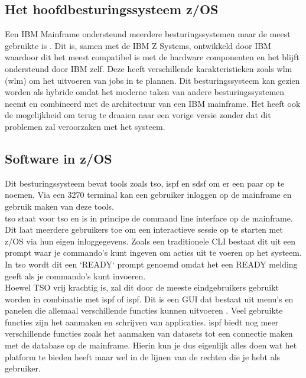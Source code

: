 \subsection{Het hoofdbesturingssysteem z/OS}
Een IBM Mainframe ondersteund meerdere besturingssystemen maar de meest gebruikte is . Dit is, samen met de IBM Z Systems, ontwikkeld door IBM waardoor dit het meest compatibel is met de hardware componenten en het blijft ondersteund door IBM zelf. Deze heeft verschillende karakteristieken zoals \acrlong{wlm} (\acrshort{wlm}) om het uitvoeren van jobs in te plannen. Dit besturingssysteem kan gezien worden als hybride omdat het moderne taken van andere besturingssystemen neemt en combineerd met de architectuur van een IBM mainframe. Het heeft ook de mogelijkheid om terug te draaien naar een vorige versie zonder dat dit problemen zal veroorzaken met het systeem. \autocite{Rupp2022} 

\subsection{Software in z/OS}
Dit besturingssysteem bevat tools zoals \acrshort{tso}, \acrshort{ispf} en \acrshort{sdsf} om er een paar op te noemen. Via een 3270 terminal kan een gebruiker inloggen op de mainframe en gebruik maken van deze tools. \\

\acrlong{tso} staat voor \acrlong{tso} en is in principe de command line interface op de mainframe. Dit laat meerdere gebruikers toe om een interactieve sessie op te starten met z/OS via hun eigen inloggegevens. Zoals een traditionele CLI bestaat dit uit een prompt waar je commando's kunt ingeven om acties uit te voeren op het systeem. In \acrlong{tso} wordt dit een `READY` prompt genoemd omdat het een READY melding geeft als je commando's kunt invoeren. \autocite{IBM} \\

Hoewel TSO vrij krachtig is, zal dit door de meeste eindgebruikers gebruikt worden in combinatie met \acrshort{ispf} of \acrlong{ispf}. Dit is een GUI dat bestaat uit menu's en panelen die allemaal verschillende functies kunnen uitvoeren \autocite{IBM}. Veel gebruikte functies zijn het aanmaken en schrijven van applicaties. \acrshort{ispf} biedt nog meer verschillende functies zoals het aanmaken van datasets tot een connectie maken met de database op de mainframe. Hierin kun je dus eigenlijk alles doen wat het platform te bieden heeft maar wel in de lijnen van de rechten die je hebt als gebruiker. \autocite{IBM} \\

